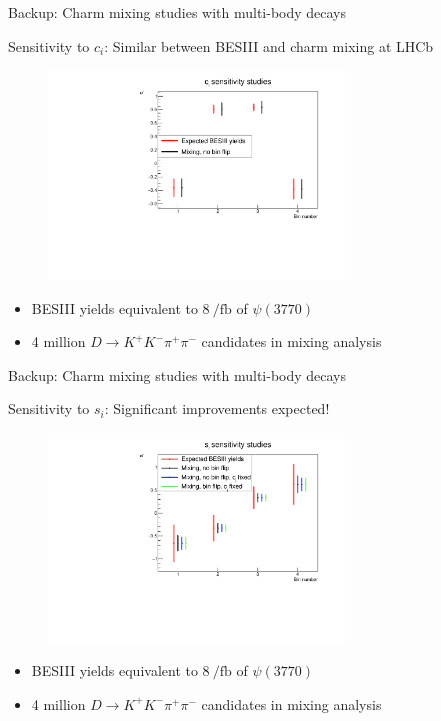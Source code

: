 \documentclass[xcolor={dvipsnames}]{beamer}
\begin{document}
\begin{frame}{Backup: Charm mixing studies with multi-body decays}
  \begin{center}
    {\large Sensitivity to $c_i$: Similar between BESIII and charm mixing at LHCb}
  \end{center}
  \begin{figure}[htb]
    \centering
    \includegraphics[width=0.7\textwidth]{Plots/ci_sensitivity.pdf}
  \end{figure}
  \vspace{-0.4cm}
  \begin{itemize}
    \item{BESIII yields equivalent to $\SI{8}{\per\femto\barn}$ of $\psi(3770)$}
    \item{4 million $D\to K^+K^-\pi^+\pi^-$ candidates in mixing analysis}
    \end{itemize}
\end{frame}

\begin{frame}{Backup: Charm mixing studies with multi-body decays}
  \begin{center}
    {\large Sensitivity to $s_i$: Significant improvements expected!}
  \end{center}
  \begin{figure}[htb]
    \centering
    \includegraphics[width=0.7\textwidth]{Plots/si_sensitivity.pdf}
  \end{figure}
  \vspace{-0.4cm}
  \begin{itemize}
    \item{BESIII yields equivalent to $\SI{8}{\per\femto\barn}$ of $\psi(3770)$}
    \item{4 million $D\to K^+K^-\pi^+\pi^-$ candidates in mixing analysis}
  \end{itemize}
\end{frame}
\end{document}
